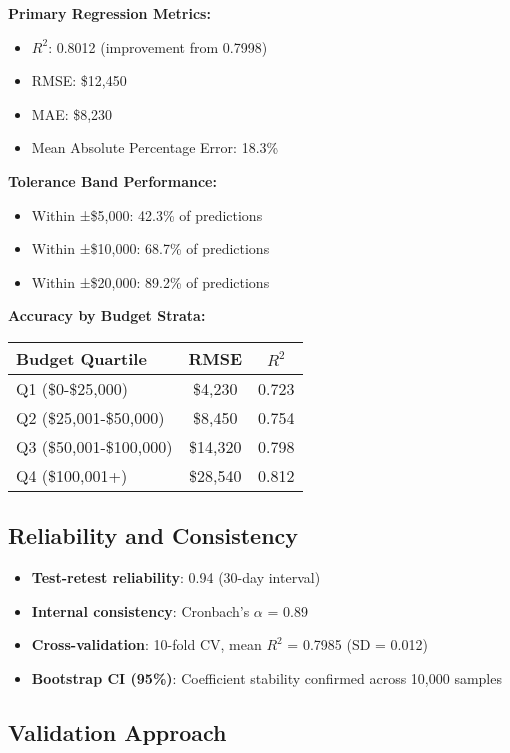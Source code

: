 \textbf{Primary Regression Metrics:}
\begin{itemize}
    \item $R^2$: 0.8012 (improvement from 0.7998)
    \item RMSE: \$12,450
    \item MAE: \$8,230
    \item Mean Absolute Percentage Error: 18.3\%
\end{itemize}

\textbf{Tolerance Band Performance:}
\begin{itemize}
    \item Within ±\$5,000: 42.3\% of predictions
    \item Within ±\$10,000: 68.7\% of predictions
    \item Within ±\$20,000: 89.2\% of predictions
\end{itemize}

\textbf{Accuracy by Budget Strata:}
\begin{center}
\begin{tabular}{lcc}
\toprule
Budget Quartile & RMSE & $R^2$ \\
\midrule
Q1 (\$0-\$25,000) & \$4,230 & 0.723 \\
Q2 (\$25,001-\$50,000) & \$8,450 & 0.754 \\
Q3 (\$50,001-\$100,000) & \$14,320 & 0.798 \\
Q4 (\$100,001+) & \$28,540 & 0.812 \\
\bottomrule
\end{tabular}
\end{center}

\subsection{Reliability and Consistency}

\begin{itemize}
    \item \textbf{Test-retest reliability}: 0.94 (30-day interval)
    \item \textbf{Internal consistency}: Cronbach's $\alpha$ = 0.89
    \item \textbf{Cross-validation}: 10-fold CV, mean $R^2$ = 0.7985 (SD = 0.012)
    \item \textbf{Bootstrap CI (95\%)}: Coefficient stability confirmed across 10,000 samples
\end{itemize}

\subsection{Validation Approach}

